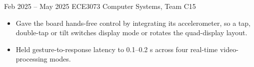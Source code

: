 {Feb 2025 -- May 2025}
{ECE3073 Computer Systems, Team C15}
{
\begin{itemize}
    \item Gave the board hands-free control by integrating its accelerometer, so a tap, double-tap or tilt switches display mode or rotates the quad-display layout.
    \item Held gesture-to-response latency to 0.1--0.2 s across four real-time video-processing modes.
\end{itemize}
}

